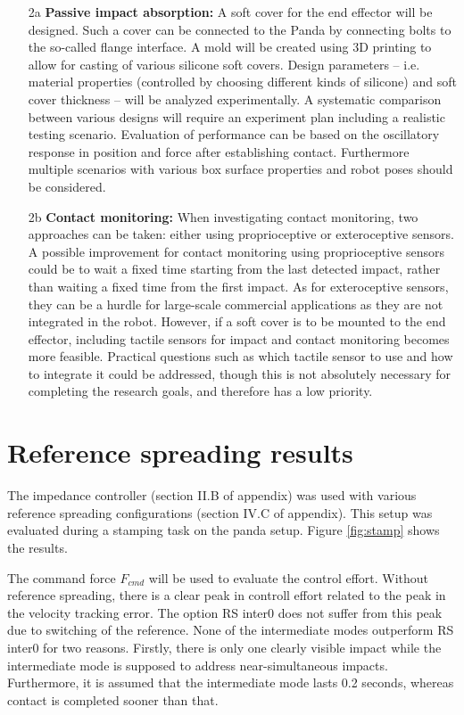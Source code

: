 \documentclass[11pt]{report}
\numberwithin{equation}{section}        %
\numberwithin{figure}{section}          %
\numberwithin{table}{section}           %
\begin{document}
\begin{enumerate}
   \item[2a] \textbf{Passive impact absorption:} A soft cover for the end effector will be designed. Such a cover can be connected to the Panda by connecting bolts to the so-called flange interface. A mold will be created using 3D printing to allow for casting of various silicone soft covers. Design parameters -- i.e. material properties (controlled by choosing different kinds of silicone) and soft cover thickness -- will be analyzed experimentally. A systematic comparison between various designs will require an experiment plan including a realistic testing scenario. Evaluation of performance can be based on the oscillatory response in position and force after establishing contact. Furthermore multiple scenarios with various box surface properties and robot poses should be considered.
  
  \item[2b] \textbf{Contact monitoring:} When investigating contact monitoring, two approaches can be taken: either using proprioceptive or exteroceptive sensors. A possible improvement for contact monitoring using proprioceptive sensors could be to wait a fixed time starting from the last detected impact, rather than waiting a fixed time from the first impact. As for exteroceptive sensors, they can be a hurdle for large-scale commercial applications as they are not integrated in the robot. However, if a soft cover is to be mounted to the end effector, including tactile sensors for impact and contact monitoring becomes more feasible. Practical questions such as which tactile sensor to use and how to integrate it could be addressed, though this is not absolutely necessary for completing the research goals, and therefore has a low priority.
  \end{enumerate}
\newpage
  \section{Reference spreading results}\label{sec:results}
  The impedance controller (section II.B of appendix) was used with various reference spreading configurations (section IV.C of appendix). This setup was evaluated during a stamping task on the panda setup. Figure \ref{fig:stamp} shows the results.

  The command force $F_{cmd}$ will be used to evaluate the control effort. Without reference spreading, there is a clear peak in controll effort related to the peak in the velocity tracking error. The option RS inter0 does not suffer from this peak due to switching of the reference. None of the intermediate modes outperform RS inter0 for two reasons. Firstly, there is only one clearly visible impact while the intermediate mode is supposed to address near-simultaneous impacts. Furthermore, it is assumed that the intermediate mode lasts 0.2 seconds, whereas contact is completed sooner than that.
\end{document}
